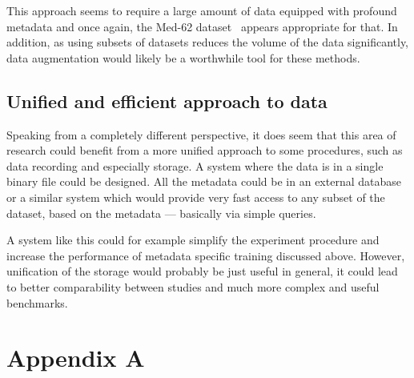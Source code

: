 \documentclass[english, he, bc, kiv, iso690alph]{fasthesis}
\begin{document}
This approach seems to require a large amount of data equipped with profound metadata and once again, the Med-62 dataset~\cite{data:stieger:21} appears appropriate for that. In addition, as using subsets of datasets reduces the volume of the data significantly, data augmentation would likely be a worthwhile tool for these methods.

\section{Unified and efficient approach to data}

Speaking from a completely different perspective, it does seem that this area of research could benefit from a more unified approach to some procedures, such as data recording and especially storage. A system where the data is in a single binary file could be designed. All the metadata could be in an external database or a similar system which would provide very fast access to any subset of the dataset, based on the metadata --- basically via simple queries.

A system like this could for example simplify the experiment procedure and increase the performance of metadata specific training discussed above. However, unification of the storage would probably be just useful in general, it could lead to better comparability between studies and much more complex and useful benchmarks.

\appendix
\chapter{Appendix A}

\backmatter
\printbibliography
\backpage
\end{document}
